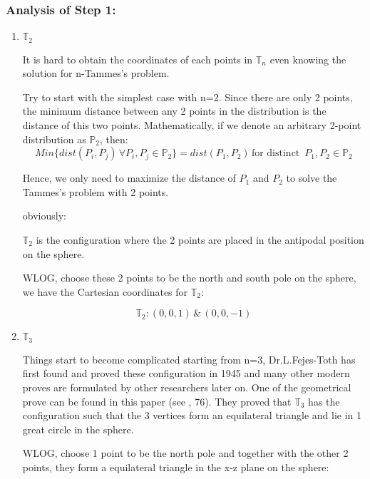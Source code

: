 \documentclass[12pt]{article}
\numberwithin{equation}{section}
\let\bb\mathbb
\let\bb\mathbb
\begin{document}
		\subsubsection{Analysis of Step 1:}  \par
		\begin{enumerate}
			\item  $\bb{T}_2$ \par 
			It is hard to obtain the coordinates of each points in $\bb{T}_n$ even knowing the solution for n-Tammes's problem. 
			\par 
			Try to start with the simplest case with n=2. Since there are only 2 points, the minimum distance between any 2 points in the distribution is the distance of this two points. Mathematically, if we denote an arbitrary 2-point distribution as $\bb{P}_2$, then:
			\[  Min \{dist(P_i, P_j) \,  \forall P_i,P_j \in \bb{P}_2\} 
			=  dist(P_1, P_2)\,  \text{for distinct } \, P_1, P_2  \in \bb{P}_2  \]
			
			Hence, we only need to maximize the distance of $P_1 $ and $P_2$ to solve the Tammes's problem with 2 points.
			
			obviously:
			\par 
			$\bb{T}_2$ is the configuration where the 2 points are placed in the antipodal position on the sphere. \par
			
			WLOG, choose these 2 points to be the north and south pole on the sphere, we have the Cartesian coordinates for $ \bb{T}_2$:
			
			\begin{equation}
				\label{t2}
				\bb{T}_2 : (0,0,1) \, \& \, (0,0,-1)
			\end{equation}
			\item $\bb{T}_3$ \par 
			
			Things start to become complicated starting from n=3, Dr.L.Fejes-Toth has first found and proved these configuration in 1945 and many other modern proves are formulated by other researchers later on. One of the geometrical prove can be found in this paper (see \cite{antoniano_2019_the}, 76). They proved that $\bb{T}_3$ has the configuration such that the 3 vertices form an equilateral triangle and lie in 1 great circle in the sphere. \par 
			
			WLOG, choose 1 point to be the north pole and together with the other 2 points, they form a equilateral triangle in the x-z plane on the sphere: 
			

\end{enumerate}
\end{document}
